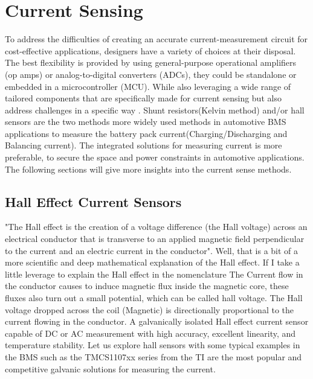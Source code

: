 \section{Current Sensing}
To address the difficulties of creating an accurate current-measurement circuit for cost-effective applications, designers have a variety of choices at their disposal. The best flexibility is provided by using general-purpose operational amplifiers (op amps) or analog-to-digital converters (ADCs), they could be standalone or embedded in a microcontroller (MCU). While also leveraging a wide range of tailored components that are specifically made for current sensing but also address challenges in a specific way \cite{TI_Current_Sensing}.
Shunt resistors(Kelvin method) and/or hall sensors are the two methods more widely used methods in automotive BMS applications to measure the battery pack current(Charging/Discharging and Balancing current). The integrated solutions for measuring current is more preferable, to secure the space and power constraints in automotive applications. The following sections will give more insights into the current sense methods.

\subsection{Hall Effect Current Sensors }
"The Hall effect is the creation of a voltage difference (the Hall voltage) across an electrical conductor that is transverse to an applied magnetic field perpendicular to the current and an electric current in the conductor". Well, that is a bit of a more scientific and deep mathematical explanation of the Hall effect. If I take a little leverage to explain the Hall effect in the nomenclature The Current flow in the conductor causes to induce magnetic flux inside the magnetic core, these fluxes also turn out a small potential, which can be called hall voltage. The Hall voltage dropped across the coil (Magnetic) is directionally proportional to the current flowing in the conductor.
A galvanically isolated Hall effect current sensor capable of DC or AC measurement with high accuracy, excellent linearity, and temperature stability\cite{TI_Hall_Current_Sensing_TMCS1107}.
Let us explore hall sensors with some typical examples in the BMS such as the TMCS1107xx \cite{TI_Hall_Current_Sensing_TMCS1107} series from the TI are the most popular and competitive galvanic solutions for measuring the current.

